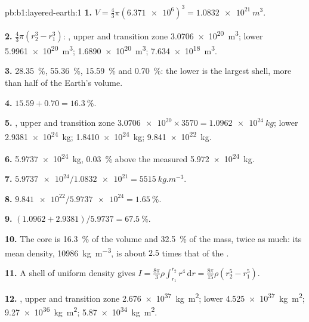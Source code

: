 \begin{solution}{pb:b1:layered-earth:1}
\textbf{1.} $V = \tfrac43\pi(\num{6.371e6})^3 = \qty{1.0832e21}{m^3}$.

\textbf{2.} $\tfrac43\pi(r_2^3 - r_1^3)$: , upper  and transition zone
\qty{3.0706e20}{m^3}; lower  \qty{5.9961e20}{m^3}; 
\qty{1.6890e20}{m^3};  \qty{7.634e18}{m^3}.

\textbf{3.} \qty{28.35}{\percent}, \qty{55.36}{\percent}, \qty{15.59}{\percent}
and \qty{0.70}{\percent}: the lower  is the largest shell, more than half
of the Earth's volume.

\textbf{4.} $15.59 + 0.70 = \qty{16.3}{\percent}$.

\textbf{5.} , upper  and transition zone $\num{3.0706e20}\times3570 =
\qty{1.0962e24}{kg}$; lower  \qty{2.9381e24}{kg}; 
\qty{1.8410e24}{kg};  \qty{9.841e22}{kg}.

\textbf{6.} \qty{5.9737e24}{kg}, \qty{0.03}{\percent} above the measured
\qty{5.972e24}{kg}.

\textbf{7.} $\num{5.9737e24}/\num{1.0832e21} = \qty{5515}{kg.m^{-3}}$.

\textbf{8.} $\num{9.841e22}/\num{5.9737e24} = \qty{1.65}{\percent}$.

\textbf{9.} $(1.0962 + 2.9381)/5.9737 = \qty{67.5}{\percent}$.

\textbf{10.} The core is \qty{16.3}{\percent} of the volume and
\qty{32.5}{\percent} of the mass, twice as much: its mean density,
\qty{10986}{kg.m^{-3}}, is about $2.5$ times that of the .

\textbf{11.} A shell of uniform density gives
$I = \tfrac{8\pi}{3}\rho\int_{r_1}^{r_2} r^4\,\mathrm dr = \tfrac{8\pi}{15}\rho
(r_2^5 - r_1^5)$.

\textbf{12.} , upper  and transition zone \qty{2.676e37}{kg.m^2}; lower 
\qty{4.525e37}{kg.m^2};  \qty{9.27e36}{kg.m^2}; 
\qty{5.87e34}{kg.m^2}.


\end{solution}
